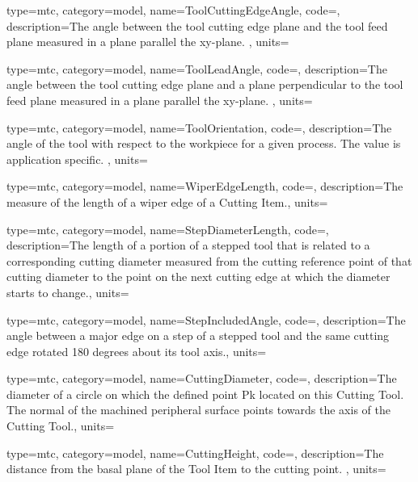 {
  type=mtc,
  category=model,
  name={ToolCuttingEdgeAngle},
  code=,
  description={The angle between the tool cutting edge plane and the tool feed plane measured in a plane parallel the xy-plane. },
  units=
}


{
  type=mtc,
  category=model,
  name={ToolLeadAngle},
  code=,
  description={The angle between the tool cutting edge plane and a plane perpendicular to the tool feed plane measured in a plane parallel the xy-plane. },
  units=
}


{
  type=mtc,
  category=model,
  name={ToolOrientation},
  code=,
  description={The angle of the tool with respect to the workpiece for a given process. The value is application specific. },
  units=
}


{
  type=mtc,
  category=model,
  name={WiperEdgeLength},
  code=,
  description={The measure of the length of a wiper edge of a Cutting Item.},
  units=
}


{
  type=mtc,
  category=model,
  name={StepDiameterLength},
  code=,
  description={The length of a portion of a stepped tool that is related to a corresponding cutting diameter measured from the cutting reference point of that cutting diameter to the point on the next cutting edge at which the diameter starts to change.},
  units=
}


{
  type=mtc,
  category=model,
  name={StepIncludedAngle},
  code=,
  description={The angle between a major edge on a step of a stepped tool and the same cutting edge rotated 180 degrees about its tool axis.},
  units=
}


{
  type=mtc,
  category=model,
  name={CuttingDiameter},
  code=,
  description={The diameter of a circle on which the defined point Pk located on this Cutting Tool. The normal of the machined peripheral surface points towards the axis of the Cutting Tool.},
  units=
}


{
  type=mtc,
  category=model,
  name={CuttingHeight},
  code=,
  description={The distance from the basal plane of the Tool Item to the cutting point. },
  units=
}


